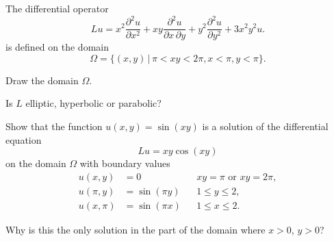 The differential operator
\[
Lu=
x^2\frac{\partial^2u}{\partial x^2}
+xy\frac{\partial^2u}{\partial x\,\partial y}
+y^2\frac{\partial^2u}{\partial y^2}
+3x^2y^2u.
\]
is defined on the domain
\[
\Omega=\{
(x,y)\,|\,\pi < xy < 2\pi, x < \pi,y < \pi
\}.
\]
\begin{teilaufgaben}
\item
Draw the domain $\Omega$.
\item
Is $L$ elliptic, hyperbolic or parabolic?
\item
Show that the function $u(x,y)=\sin(xy)$ is a solution of the differential
equation
\[
Lu=xy\cos(xy)
\]
on the domain $\Omega$ with boundary values
\begin{align*}
u(x,y)&=0            &&\text{$xy=\pi$ or $xy=2\pi$},\\
u(\pi,y)&=\sin(\pi y)&&1\le y\le 2,\\
u(x,\pi)&=\sin(\pi x)&&1\le x\le 2.
\end{align*}
\item
Why is this the only solution in the part of the domain where
$x>0$, $y>0$?
\end{teilaufgaben}

